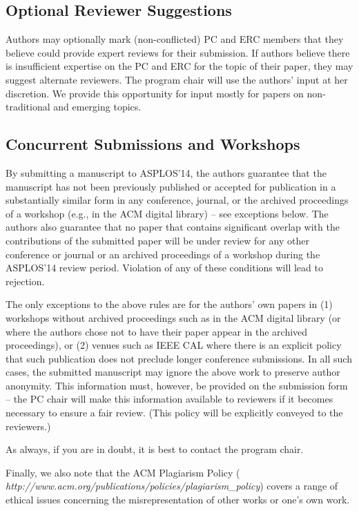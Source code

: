 \documentclass[pageno]{jpaper}
\begin{document}
\subsection{Optional Reviewer Suggestions}

Authors may optionally mark (non-conflicted) PC and ERC members that they
believe could provide expert reviews for their submission.  If authors
believe there is insufficient expertise on the PC and ERC for the topic of
their paper, they may suggest alternate reviewers.  The program chair will
use the authors' input at her discretion.  We provide this opportunity
for input mostly for papers on non-traditional and emerging topics.


\subsection{Concurrent Submissions and Workshops}

By submitting a manuscript to ASPLOS'14, the authors guarantee that the
manuscript has not been previously published or accepted for publication in
a substantially similar form in any conference, journal, or the archived
proceedings of a workshop (e.g., in the ACM digital library) -- see
exceptions below. The authors also guarantee that no paper that contains
significant overlap with the contributions of the submitted paper will be
under review for any other conference or journal or an archived proceedings
of a workshop during the ASPLOS'14 review period. Violation of any of these
conditions will lead to rejection.

The only exceptions to the above rules are for the authors' own papers in
(1) workshops without archived proceedings such as in the ACM digital
library (or where the authors chose not to have their paper appear in the
archived proceedings), or (2) venues such as IEEE CAL where there is an
explicit policy that such publication does not preclude longer conference
submissions.  In all such cases, the submitted manuscript may ignore the
above work to preserve author anonymity. This information must, however, be
provided on the submission form -- the PC chair will make this information
available to reviewers if it becomes necessary to ensure a fair review.
(This policy will be explicitly conveyed to the reviewers.)

As always, if you are in doubt, it is best to contact the program chair.

Finally, we also note that the ACM Plagiarism Policy ({\em
http://www.acm.org/publications/policies/plagiarism\_policy}) covers a
range of ethical issues concerning the misrepresentation of other works or
one's own work.
\end{document}
